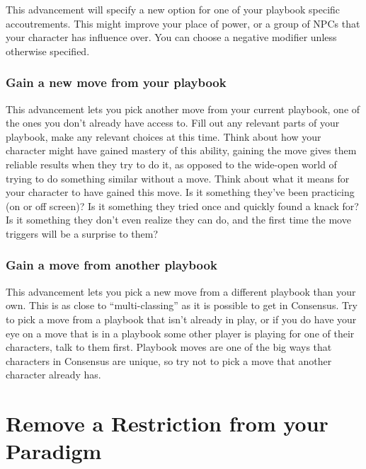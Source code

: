 \documentclass[
]{memoir}
\begin{document}
This advancement will specify a new option for one of your playbook
specific accoutrements. This might improve your place of power, or a
group of NPCs that your character has influence over. You can choose a
negative modifier unless otherwise specified.

\hypertarget{gain-a-new-move-from-your-playbook}{%
\subsubsection{Gain a new move from your
playbook}\label{gain-a-new-move-from-your-playbook}}

This advancement lets you pick another move from your current playbook,
one of the ones you don't already have access to. Fill out any relevant
parts of your playbook, make any relevant choices at this time. Think
about how your character might have gained mastery of this ability,
gaining the move gives them reliable results when they try to do it, as
opposed to the wide-open world of trying to do something similar without
a move. Think about what it means for your character to have gained this
move. Is it something they've been practicing (on or off screen)? Is it
something they tried once and quickly found a knack for? Is it something
they don't even realize they can do, and the first time the move
triggers will be a surprise to them?

\hypertarget{gain-a-move-from-another-playbook}{%
\subsubsection{Gain a move from another
playbook}\label{gain-a-move-from-another-playbook}}

This advancement lets you pick a new move from a different playbook than
your own. This is as close to ``multi-classing'' as it is possible to
get in Consensus. Try to pick a move from a playbook that isn't already
in play, or if you do have your eye on a move that is in a playbook some
other player is playing for one of their characters, talk to them first.
Playbook moves are one of the big ways that characters in Consensus are
unique, so try not to pick a move that another character already has.

\hypertarget{remove-a-restriction-from-your-paradigm}{%
\section{Remove a Restriction from your
Paradigm}\label{remove-a-restriction-from-your-paradigm}}
\end{document}
